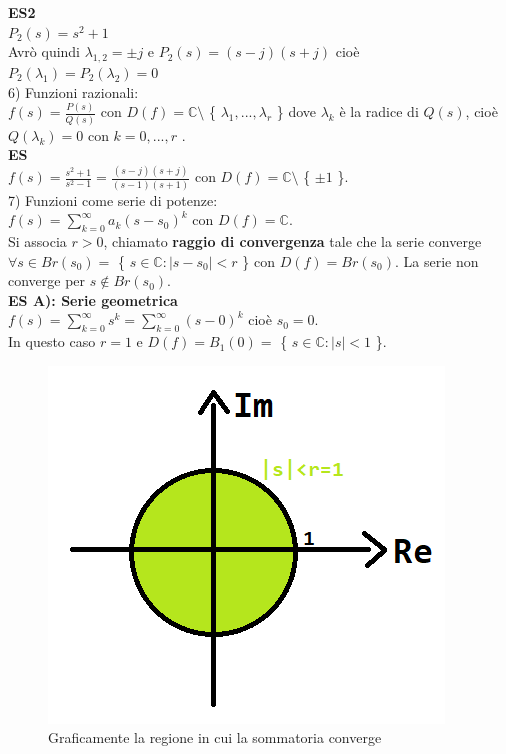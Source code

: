 \textbf{ES2}\\
$ P_{2}(s) = s^{2} +1$\\
Avrò quindi $ \lambda_{1,2} = \pm j$ e $ P_{2}(s) = (s-j)(s+j)$ cioè $ P_{2}( \lambda_{1})=P_{2}( \lambda_{2})=0$\\

6) Funzioni razionali:\\
$ f(s) = \frac{ P(s)}{Q(s)}$ con $ D(f) = \mathbb{C} \setminus$ \{ $ \lambda_{1},..., \lambda_{r}$ \} dove $ \lambda_{k}$ è la radice di $ Q(s)$, cioè $ Q( \lambda_{k})=0$ con $ k=0,...,r$ .\\

\textbf{ES}\\
$ f(s) = \frac{ s^{2}+1}{ s^{2} -1}= \frac{ (s-j)(s+j) }{ (s-1)(s+1)} $ con $ D(f) = \mathbb{C} \setminus$ \{ $ \pm 1$ \}. \\

7) Funzioni come serie di potenze:\\
$ f(s) = \sum_{k=0}^\infty a_{k} (s-s_0)^{k}$ con $ D(f)= \mathbb{C} $. \\
Si associa $r>0$, chiamato \textbf{raggio di convergenza} tale che la serie converge $ \forall s \in Br(s_0) = $ \{ $ s \in \mathbb{C} : |s-s_0| < r$ \} con $ D(f)=Br(s_0)$. La serie non converge per $ s \notin Br(s_0)$.\\

\textbf{ES A): Serie geometrica}\\
$ f(s) = \sum_{k=0}^\infty s^{k} = \sum_{k=0}^\infty (s-0)^{k}$ cioè $s_0= 0$.\\
In questo caso $r=1$ e $ D(f)=B_1(0)=$ \{ $ s \in \mathbb{C} : |s| < 1$ \}.

\pagebreak

\begin{figure}[h]
	\centering
	\includegraphics[scale=0.5]{immagini/raggioDiConvergenza}
	\caption{ Graficamente la regione in cui la sommatoria converge }
	\label{fig: raggioDiConvergenza}
\end{figure}

